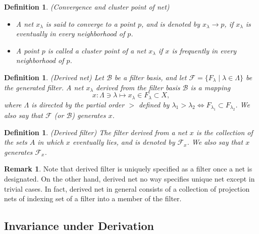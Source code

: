 \documentclass[a4paper,12pt]{article}
\newtheorem{dfn}[thm]{Definition}
\theoremstyle{remark}
\theoremstyle{definition}
\newtheorem{rem}[thm]{Remark}
\theoremstyle{definition}
\theoremstyle{definition}
\begin{document}
\begin{dfn} (Convergence and cluster point of net)
	\begin{itemize}
		\item A net \( x_{\lambda} \) is said to converge to a point \( p \), and is denoted by \( x_{\lambda}\to p \), if \( x_{\lambda} \) is eventually in every neighborhood of \( p \).
		\item A point \( p \) is called a cluster point of a net \( x_{\lambda} \) if \( x \) is frequently in every neighborhood of \( p \).
	\end{itemize}
\end{dfn}

\begin{dfn} (Derived net)
	Let \( \mathscr{B} \) be a filter basis, and let \( \mathscr{F} = \{F_{\lambda} \mid \lambda \in \Lambda \} \) be the generated filter.
	A net \( x_{\lambda} \) derived from the filter basis \( \mathscr{B} \) is a mapping
	\begin{equation*}
		x: \Lambda \ni \lambda \mapsto x_{\lambda} \in F_{\lambda} \subset X,
	\end{equation*}
	where \( \Lambda \) is directed by the partial order \( > \) defined by \( \lambda_1> \lambda_2 \iff F_{\lambda_1} \subset F_{\lambda_2} \).
	We also say that \( \mathscr{F} \) (or \( \mathscr{B} \)) generates \( x \).
\end{dfn}

\begin{dfn} (Derived filter)
	The filter derived from a net \( x \) is the collection of the sets \( A \) in which \( x \) eventually lies, and is denoted by \( \mathscr{F}_x \). We also say that \( x \) generates \( \mathscr{F}_x \).
\end{dfn}

\begin{rem}
	Note that derived filter is uniquely specified as a filter once a net is designated.
	On the other hand, derived net no way specifies unique net except in trivial cases. In fact, derived net in general consists of a collection of projection nets of indexing set of a filter into a member of the filter.
\end{rem}

\subsection{Invariance under Derivation}
\end{document}
